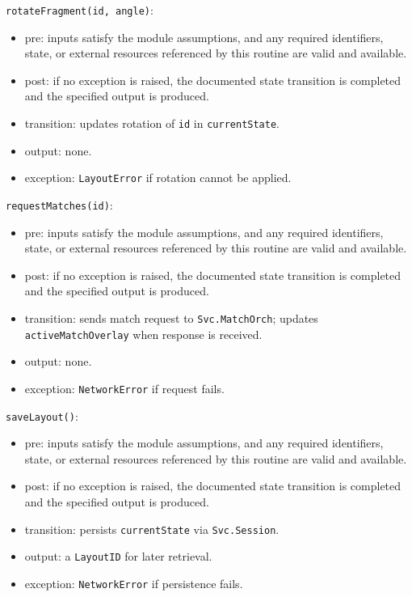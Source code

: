 \documentclass[12pt, titlepage]{article}
\begin{document}
\noindent \texttt{rotateFragment(id, angle)}:
\begin{itemize}
    \item pre: inputs satisfy the module assumptions, and any required identifiers, state, or external resources referenced by this routine are valid and available.
    \item post: if no exception is raised, the documented state transition is completed and the specified output is produced.
    \item transition: updates rotation of \texttt{id} in \texttt{currentState}.
    \item output: none.
    \item exception: \texttt{LayoutError} if rotation cannot be applied.
\end{itemize}

\noindent \texttt{requestMatches(id)}:
\begin{itemize}
    \item pre: inputs satisfy the module assumptions, and any required identifiers, state, or external resources referenced by this routine are valid and available.
    \item post: if no exception is raised, the documented state transition is completed and the specified output is produced.
    \item transition: sends match request to \texttt{Svc.MatchOrch}; updates \texttt{activeMatchOverlay} when response is received.
    \item output: none.
    \item exception: \texttt{NetworkError} if request fails.
\end{itemize}

\noindent \texttt{saveLayout()}:
\begin{itemize}
    \item pre: inputs satisfy the module assumptions, and any required identifiers, state, or external resources referenced by this routine are valid and available.
    \item post: if no exception is raised, the documented state transition is completed and the specified output is produced.
    \item transition: persists \texttt{currentState} via \texttt{Svc.Session}.
    \item output: a \texttt{LayoutID} for later retrieval.
    \item exception: \texttt{NetworkError} if persistence fails.
\end{itemize}
\end{document}
